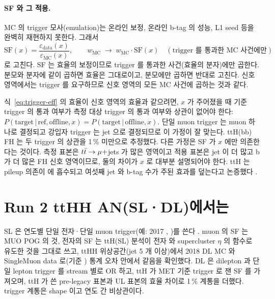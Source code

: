 \paragraph{SF 와 그 적용.}
MC 의 trigger 모사(emulation)는 온라인 보정, 온라인 b-tag 의 성능, L1 seed 등을 완벽히 재현하지 못한다. 그래서
\begin{equation}
  \mathrm{SF}(x) = \frac{\varepsilon_\text{data}(x)}{\varepsilon_\text{MC}(x)}, \qquad
  w_\text{MC} \;\to\; w_\text{MC}\cdot \mathrm{SF}(x)\quad(\text{trigger 를 통과한 MC 사건에만})
  \label{eq:trigger-sf}
\end{equation}
로 고친다. SF 는 효율의 보정이므로 trigger 를 통과한 사건(효율의 분자)에만 곱한다. 분모와 분자에 같이 곱하면 효율은 그대로이고,
분모에만 곱하면 반대로 고친다. 신호 영역에서는 trigger 를 요구하므로 신호 영역의
모든 MC 사건에 곱하는 것과 같다.

\begin{note}
식~\eqref{eq:trigger-eff} 의 효율이 신호 영역의 효율과 같으려면, $x$ 가 주어졌을 때 기준 trigger 의 통과 여부가 측정 대상
trigger 의 통과 여부와 상관이 없어야 한다: $P(\text{target}\,|\,\text{ref}, \text{offline}, x) = P(\text{target}\,|\,\text{offline}, x)$.
단일 muon trigger 는 muon 하나로 결정되고 강입자 trigger 는 jet 으로 결정되므로 이 가정이 잘 맞는다. ttH(bb) FH 는 두 trigger 의
상관을 1\,\% 미만으로 추정했다. 다른 가정은 SF 가 $x$ 에만 의존한다는 것이다. 측정 표본은
$t\bar{t}\to\mu+$jets 가 많은 영역이고 적용 표본은 jet 이 더 많고 b 가 더 많은 FH 신호 영역이므로, 둘의 차이가 $x$ 로 대부분
설명되어야 한다. ttH 는 pileup 의존이 \HT{} 에 흡수되고 여섯째 jet \pt{} 와 b-tag 수가 주된 효과를 덮는다고 논증했다
.
\end{note}

\section{Run 2 ttHH AN(SL·DL)에서는}\label{sec:trigger-an}

SL 은 연도별 단일 전자·단일 muon trigger(예: 2017 , )를 쓴다
.
muon 의 SF 는 MUO POG 의 것, 전자의 SF 는 ttH(SL) 분석이 전자 \pt{} 와 supercluster $\eta$ 의 함수로 유도한 것을 그대로 쓰고,
ttHH 위상공간(jet 5 개 이상)에서 2018 \ttbar{} DL MC 와 SingleMuon data 로(기준 ) 통계 오차 안에서 같음을
확인했다. DL 은 dilepton 과 단일 lepton trigger 를 stream 별로 OR 하고, ttH 가 MET 기준
trigger 로 잰 SF 를 가져오며, ttH 가 쓴 pre-legacy 표본과 UL 표본의 효율 차이로 1\,\% 계통을 더했다.
trigger 계통은 shape 이고 연도 간 비상관이다.

